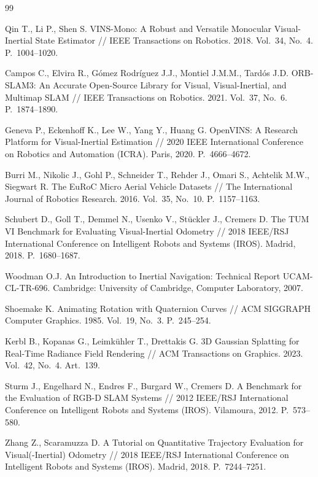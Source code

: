 \documentclass{misisarticle}
\begin{document}
\begin{thebibliography}{99}

 Qin T., Li P., Shen S. VINS-Mono: A Robust and Versatile Monocular Visual-Inertial State Estimator // IEEE Transactions on Robotics. 2018. Vol.~34, No.~4. P.~1004--1020.

 Campos C., Elvira R., Gómez Rodríguez J.J., Montiel J.M.M., Tardós J.D. ORB-SLAM3: An Accurate Open-Source Library for Visual, Visual-Inertial, and Multimap SLAM // IEEE Transactions on Robotics. 2021. Vol.~37, No.~6. P.~1874--1890.

 Geneva P., Eckenhoff K., Lee W., Yang Y., Huang G. OpenVINS: A Research Platform for Visual-Inertial Estimation // 2020 IEEE International Conference on Robotics and Automation (ICRA). Paris, 2020. P.~4666--4672.

 Burri M., Nikolic J., Gohl P., Schneider T., Rehder J., Omari S., Achtelik M.W., Siegwart R. The EuRoC Micro Aerial Vehicle Datasets // The International Journal of Robotics Research. 2016. Vol.~35, No.~10. P.~1157--1163.

 Schubert D., Goll T., Demmel N., Usenko V., Stückler J., Cremers D. The TUM VI Benchmark for Evaluating Visual-Inertial Odometry // 2018 IEEE/RSJ International Conference on Intelligent Robots and Systems (IROS). Madrid, 2018. P.~1680--1687.

 Woodman O.J. An Introduction to Inertial Navigation: Technical Report UCAM-CL-TR-696. Cambridge: University of Cambridge, Computer Laboratory, 2007.

 Shoemake K. Animating Rotation with Quaternion Curves // ACM SIGGRAPH Computer Graphics. 1985. Vol.~19, No.~3. P.~245--254.

 Kerbl B., Kopanas G., Leimkühler T., Drettakis G. 3D Gaussian Splatting for Real-Time Radiance Field Rendering // ACM Transactions on Graphics. 2023. Vol.~42, No.~4. Art.~139.

 Sturm J., Engelhard N., Endres F., Burgard W., Cremers D. A Benchmark for the Evaluation of RGB-D SLAM Systems // 2012 IEEE/RSJ International Conference on Intelligent Robots and Systems (IROS). Vilamoura, 2012. P.~573--580.

 Zhang Z., Scaramuzza D. A Tutorial on Quantitative Trajectory Evaluation for Visual(-Inertial) Odometry // 2018 IEEE/RSJ International Conference on Intelligent Robots and Systems (IROS). Madrid, 2018. P.~7244--7251.


\end{thebibliography}
\end{document}
